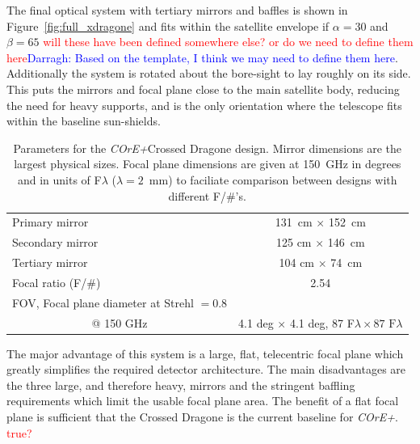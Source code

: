 \documentclass[11pt,a4paper]{article}
\newcommand{\comred}[1]{\textcolor{red}{#1}}
\newcommand{\comblue}[1]{\textcolor{blue}{#1}}
\newcommand{\coreplus}{\textit{\negthinspace COrE+\/}}
\begin{document}
The final optical system with tertiary mirrors and baffles is shown in Figure~\ref{fig:full_xdragone} and fits within 
the satellite envelope if 
$\alpha = 30$ and $\beta = 65$ \comred{will these have been defined somewhere else? or do we need to define them here}\comblue{Darragh: Based on the template, I think we may need to define them here}. 
Additionally the system is rotated about the bore-sight to lay roughly 
on its side.  This puts the mirrors and focal plane close to the main satellite body, reducing the need for 
heavy supports, and is the only orientation where the telescope fits within the baseline sun-shields. 



\begin{table}[h!]
	\centering
	\begin{tabular}{|l|c|}
		\hline
		Primary mirror   & 131~cm $\times$ 152~cm   \\
		Secondary mirror   & 125 cm $\times$ 146~cm  \\
		Tertiary mirror  & 104 cm $\times$ 74~cm    \\
		Focal ratio (F/\#)               & 2.54   \\
		\multicolumn{1}{|l|}{FOV, Focal plane diameter at Strehl $= 0.8$} & \\
		\multicolumn{1}{|c|}{@ 150 GHz}    & 4.1 deg $\times$ 4.1 deg, 87 F$\lambda \times 87 \text{~F}\lambda$ \\
		\hline
		
	\end{tabular}
	\caption{Parameters for the \coreplus Crossed Dragone design.  Mirror dimensions are the largest physical sizes.  Focal 
		plane dimensions are given at 150~GHz in degrees and in units of F$\lambda$ ($\lambda=2$~mm) to faciliate comparison between 
		designs with different F/\#'s.}
	\label{tab:mirrors}
	
\end{table}

The major advantage of this system is a large, flat, telecentric focal plane which greatly simplifies 
the required detector architecture.  The main disadvantages are the three large, and therefore heavy, 
mirrors and the stringent baffling requirements which limit the usable focal plane area.  The benefit of 
a flat focal plane is sufficient that the Crossed Dragone is the current baseline for \coreplus. \comred{true?}
\end{document}
